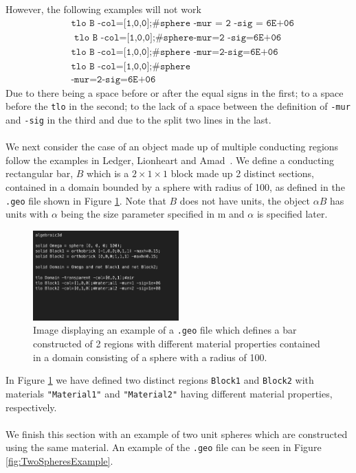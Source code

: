 However, the following examples will not work
\begin{align*}
&\texttt{tlo B -col=[1,0,0];\#sphere -mur = 2 -sig = 6E+06}\\
&\texttt{  tlo B -col=[1,0,0];\#sphere-mur=2 -sig=6E+06}\\
&\texttt{tlo B -col=[1,0,0];\#sphere -mur=2-sig=6E+06}\\
&\texttt{tlo B -col=[1,0,0];\#sphere}\\
&\texttt{-mur=2-sig=6E+06}
\end{align*}
Due to there being a space before or after the equal signs in the first; to a space before the \texttt{tlo} in the second; to the lack of a space between the definition of \texttt{-mur} and \texttt{-sig} in the third and due to the split two lines in the last.
\\
\\
We next consider the case of an object made up of multiple conducting regions follow the examples in Ledger, Lionheart and Amad~\cite{LedgerLionheartamad2019}. We define a conducting rectangular bar, $B$ which is a $2\times1\times1$ block made up 2 distinct sections, contained in a domain bounded by a sphere with radius of 100, as defined in the \texttt{.geo} file shown in Figure \ref{fig:DualBarExample}. Note that $B$ does not have units, the object $\alpha B$ has units with $\alpha$ being the size parameter specified in $\text{m}$ and $\alpha$ is specified later.

\begin{figure}[H]
\begin{center}
\includegraphics[width=0.5\textwidth]{Figures/DualBarExample.png}
\caption{Image displaying an example of a \texttt{.geo} file which defines a bar constructed of 2 regions with different material properties contained in a domain consisting of a sphere with a radius of 100.}\label{fig:DualBarExample}
\end{center}
\end{figure}
\noindent
In Figure \ref{fig:DualBarExample} we have defined two distinct regions \texttt{Block1} and \texttt{Block2} with materials \texttt{"Material1"} and \texttt{"Material2"} having different material properties, respectively.\\
\\
We finish this section with an example of two unit spheres which are constructed using the same material. An example of the \texttt{.geo} file can be seen in Figure \ref{fig:TwoSpheresExample}.

